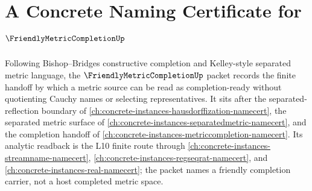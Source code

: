 \chapter{A Concrete Naming Certificate for $\FriendlyMetricCompletionUp$}
\label{ch:concrete-instances-friendly-metric-completion-namecert}

Following Bishop--Bridges constructive completion and Kelley-style separated metric language, the $\FriendlyMetricCompletionUp$ packet records the finite handoff by which a metric source can be read as completion-ready without quotienting Cauchy names or selecting representatives. It sits after the separated-reflection boundary of \autoref{ch:concrete-instances-hausdorffization-namecert}, the separated metric surface of \autoref{ch:concrete-instances-separatedmetric-namecert}, and the completion handoff of \autoref{ch:concrete-instances-metriccompletion-namecert}. Its analytic readback is the L10 finite route through \autoref{ch:concrete-instances-streamname-namecert}, \autoref{ch:concrete-instances-regseqrat-namecert}, and \autoref{ch:concrete-instances-real-namecert}; the packet names a friendly completion carrier, not a host completed metric space.


